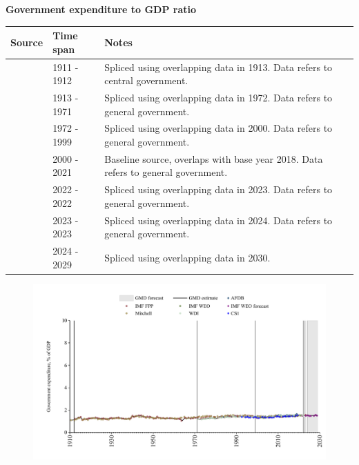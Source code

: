 \documentclass[12pt,a4paper,landscape]{article}
\begin{document}
\begin{adjustbox}{max totalsize={\paperwidth}{\paperheight},center}
\begin{minipage}[t][\textheight][t]{\textwidth}
\vspace*{0.5cm}
{}
\begin{center}
{\Large\bfseries Government expenditure to GDP ratio}
\end{center}
\vspace{0.5cm}
\begin{table}[H]
\centering
\small
\begin{tabular}{|l|l|l|}
\hline
\textbf{Source} & \textbf{Time span} & \textbf{Notes} \\
\hline
\rowcolor{white}\cite{Mitchell}& 1911 - 1912 &Spliced using overlapping data in 1913. Data refers to central government.\\
\rowcolor{lightgray}\cite{IMF_FPP}& 1913 - 1971 &Spliced using overlapping data in 1972. Data refers to general government.\\
\rowcolor{white}\cite{WDI}& 1972 - 1999 &Spliced using overlapping data in 2000. Data refers to general government.\\
\rowcolor{lightgray}\cite{IMF_WEO}& 2000 - 2021 &Baseline source, overlaps with base year 2018. Data refers to general government.\\
\rowcolor{white}\cite{WDI}& 2022 - 2022 &Spliced using overlapping data in 2023. Data refers to general government.\\
\rowcolor{lightgray}\cite{IMF_FPP}& 2023 - 2023 &Spliced using overlapping data in 2024. Data refers to general government.\\
\rowcolor{white}\cite{IMF_WEO_forecast}& 2024 - 2029 &Spliced using overlapping data in 2030. \\
\hline
\end{tabular}
\end{table}
\begin{figure}[H]
\centering
\includegraphics[width=\textwidth,height=0.6\textheight,keepaspectratio]{graphs/ZAF_govexp_GDP.pdf}
\end{figure}
\end{minipage}
\end{adjustbox}
\end{document}
